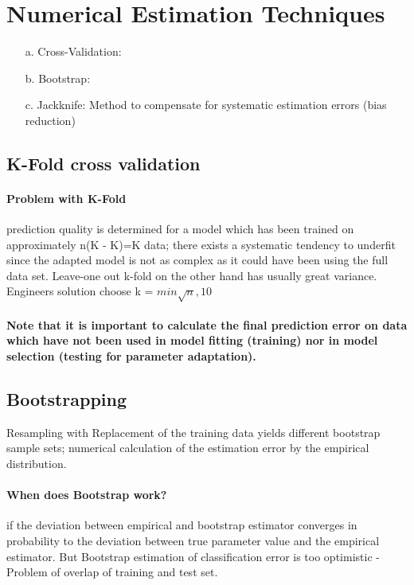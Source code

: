 \section{Numerical Estimation Techniques}

\begin{itemize}
    \item[a.]Cross-Validation:
    \item[b.]Bootstrap:
    \item[c.]Jackknife: Method to compensate for systematic estimation errors (bias reduction)
\end{itemize}{}

\subsection{K-Fold cross validation}

\paragraph{Problem with K-Fold}
prediction quality is determined for a model which has been trained
on approximately n(K - K)=K data; there exists a systematic tendency
to underfit since the adapted model is not as complex as it could have
been using the full data set. Leave-one out k-fold on the other hand has usually great variance. Engineers solution choose k = $min{\sqrt{n}, 10}$ \\
\\
\textbf{Note that it is important to calculate the final prediction error on data which have not been used in model fitting (training) nor in model selection (testing for parameter adaptation).}

\subsection{Bootstrapping}
Resampling with Replacement of the training data yields different bootstrap sample sets; numerical calculation of the estimation error by the empirical distribution.

\paragraph{When does Bootstrap work?}
if the deviation between empirical and bootstrap estimator converges in probability to the deviation between true parameter value and the empirical estimator. But Bootstrap estimation of classification error is too optimistic - Problem of overlap of training and test set.

